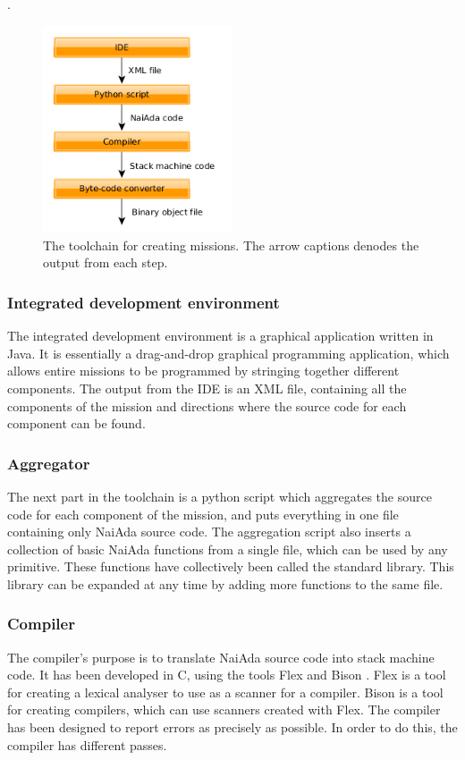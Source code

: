 \pageref{fig:another_column_figure}.
\begin{figure}[h]
    \includegraphics[width=0.5\textwidth]{./figure/figureMissionCreationToolchain.png}
    \caption{The toolchain for creating missions. The arrow captions denodes the output from each step.}
    \label{fig:another_column_figure}
\end{figure}


\subsubsection{Integrated development environment}
The integrated development environment is a graphical application written in Java. It is essentially a drag-and-drop graphical programming application, which allows entire missions to be programmed by stringing together different components. The output from the IDE is an XML file, containing all the components of the mission and directions where the source code for each component can be found.

\subsubsection{Aggregator}
The next part in the toolchain is a python script which aggregates the source code for each component of the mission, and puts everything in one file containing only NaiAda source code. The aggregation script also inserts a collection of basic NaiAda functions from a single file, which can be used by any primitive. These functions have collectively been called the standard library. This library can be expanded at any time by adding more functions to the same file.

\subsubsection{Compiler}
The compiler's purpose is to translate NaiAda source code into stack machine code. It has been developed in C, using the tools Flex \cite{web:mcsflex} and Bison \cite{web:mcsbison}. Flex is a tool for creating a lexical analyser to use as a scanner for a compiler. Bison is a tool for creating compilers, which can use scanners created with Flex. The compiler has been designed to report errors as precisely as possible. In order to do this, the compiler has different passes.

